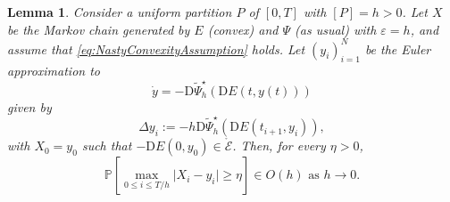\documentclass[reqno]{amsart}
\newtheorem{lemma}[theorem]{Lemma}
\theoremstyle{definition}
\begin{document}
\begin{lemma}
	\label{lem:ParabolicTightnessDiscrete}
	Consider a uniform partition $P$ of $[0, T]$ with $[P] = h > 0$.  Let $X$ be the Markov chain generated by $E$ (convex) and $\Psi$ (as usual) with ${\varepsilon} = h$, and assume that \eqref{eq:NastyConvexityAssumption} holds.  Let $(y_{i})_{i = 1}^{N}$ be the Euler approximation to
	\[
		\dot{y} = - {\mathrm{D}} {\widetilde{\Psi}}_{h}^{\star} ( {\mathrm{D}} E(t, y(t)) )
	\]
	given by
	\[
		\Delta y_{i} := - h {\mathrm{D}} {\widetilde{\Psi}}_{h}^{\star} ( {\mathrm{D}} E(t_{i + 1}, y_{i})),
	\]
	with $X_{0} = y_{0}$ such that $- {\mathrm{D}} E(0, y_{0}) \in \mathring{\mathcal{E}}$.  Then, for every $\eta > 0$,
	\begin{equation}
		\label{eq:ParabolicTightnessDiscrete} 		\mathbb{P} \left[ \max_{0 \leq i \leq T / h} \big| X_{i} - y_{i} \big| \geq \eta \right] \in O(h) \text{ as } h \to 0.
	\end{equation}
\end{lemma}
\end{document}
